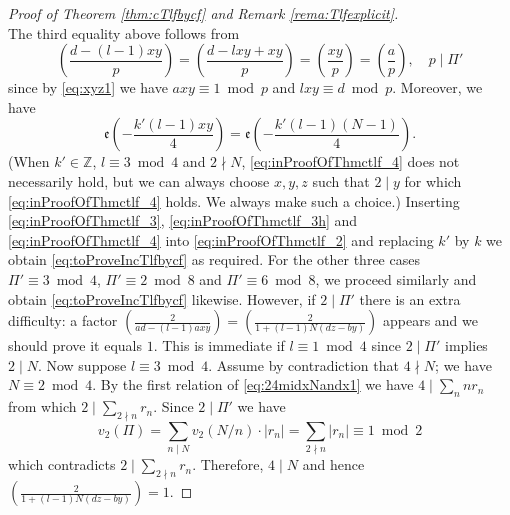 \documentclass[12pt]{amsart}
\numberwithin{equation}{section}
\theoremstyle{plain}
\theoremstyle{definition}
\theoremstyle{remark}
\newcommand\legendre[2]{\genfrac{(}{)}{}{}{#1}{#2}}
\newcommand*\abs[1]{\lvert#1\rvert}
\newcommand\etp[1]{\mathfrak{e}\left(#1\right)}
\newcommand\numZ{\mathbb{Z}}
\begin{document}
\begin{proof}[Proof of Theorem \ref{thm:cTlfbycf} and Remark \ref{rema:Tlfexplicit}]
\begin{equation}
\end{equation}
The third equality above follows from
\begin{equation*}
\legendre{d-(l-1)xy}{p}=\legendre{d-lxy+xy}{p}=\legendre{xy}{p}=\legendre{a}{p},\quad p\mid \varPi'
\end{equation*}
since by \eqref{eq:xyz1} we have $axy\equiv1\bmod{p}$ and $lxy\equiv d\bmod{p}$. Moreover, we have
\begin{equation}
\label{eq:inProofOfThmctlf_4}
\etp{-\frac{k'(l-1)xy}{4}}=\etp{-\frac{k'(l-1)(N-1)}{4}}.
\end{equation}
(When $k'\in\numZ$, $l\equiv3\bmod{4}$ and $2\nmid N$, \eqref{eq:inProofOfThmctlf_4} does not necessarily hold, but we can always choose $x,y,z$ such that $2\mid y$ for which \eqref{eq:inProofOfThmctlf_4} holds. We always make such a choice.) Inserting \eqref{eq:inProofOfThmctlf_3}, \eqref{eq:inProofOfThmctlf_3h} and \eqref{eq:inProofOfThmctlf_4} into \eqref{eq:inProofOfThmctlf_2} and replacing $k'$ by $k$ we obtain \eqref{eq:toProveIncTlfbycf} as required. For the other three cases $\varPi'\equiv3\bmod{4}$, $\varPi'\equiv2\bmod{8}$ and $\varPi'\equiv6\bmod{8}$, we proceed similarly and obtain \eqref{eq:toProveIncTlfbycf} likewise. However, if $2\mid \varPi'$ there is an extra difficulty: a factor $\legendre{2}{ad-(l-1)axy}=\legendre{2}{1+(l-1)N(dz-by)}$ appears and we should prove it equals $1$. This is immediate if $l\equiv1\bmod{4}$ since $2\mid \varPi'$ implies $2\mid N$. Now suppose $l\equiv3\bmod{4}$. Assume by contradiction that $4\nmid N$; we have $N\equiv2\bmod{4}$. By the first relation of \eqref{eq:24midxNandx1} we have $4\mid\sum_nnr_n$ from which $2\mid\sum_{2\nmid n}r_n$. Since $2\mid\varPi'$ we have
\begin{equation*}
v_2(\varPi)=\sum_{n\mid N}v_2(N/n)\cdot\abs{r_{n}}=\sum_{2\nmid n}\abs{r_n}\equiv1\bmod{2}
\end{equation*}
which contradicts $2\mid\sum_{2\nmid n}r_n$. Therefore, $4\mid N$ and hence $\legendre{2}{1+(l-1)N(dz-by)}=1$.


\end{proof}
\end{document}
